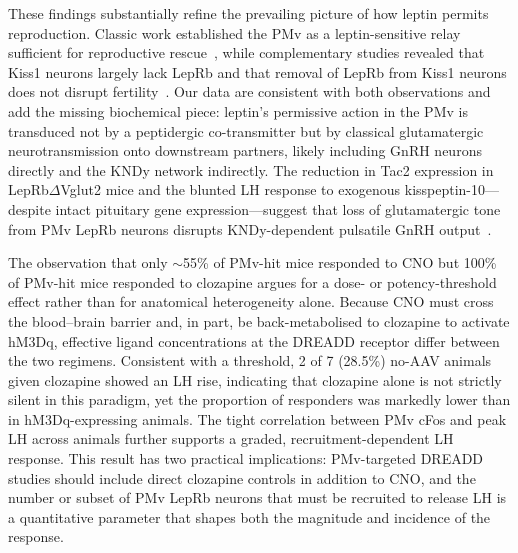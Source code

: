 \documentclass[11pt]{article}
\begin{document}
These findings substantially refine the prevailing picture of how leptin permits reproduction. Classic work established the PMv as a leptin-sensitive relay sufficient for reproductive rescue~\citep{donato2011leptin,mahany2018obesity,leshan2009direct,williams2011acute}, while complementary studies revealed that Kiss1 neurons largely lack LepRb and that removal of LepRb from Kiss1 neurons does not disrupt fertility~\citep{donato2011leptin,cravo2011kiss1,louis2011molecular,true2011leptin}. Our data are consistent with both observations and add the missing biochemical piece: leptin's permissive action in the PMv is transduced not by a peptidergic co-transmitter but by classical glutamatergic neurotransmission onto downstream partners, likely including GnRH neurons directly and the KNDy network indirectly. The reduction in Tac2 expression in LepRb$\Delta$Vglut2 mice and the blunted LH response to exogenous kisspeptin-10---despite intact pituitary gene expression---suggest that loss of glutamatergic tone from PMv LepRb neurons disrupts KNDy-dependent pulsatile GnRH output~\citep{navarro2011regulation,navarro2013interactions,gottsch2004role}.

The observation that only $\sim$55\% of PMv-hit mice responded to CNO but 100\% of PMv-hit mice responded to clozapine argues for a dose- or potency-threshold effect rather than for anatomical heterogeneity alone. Because CNO must cross the blood--brain barrier and, in part, be back-metabolised to clozapine to activate hM3Dq, effective ligand concentrations at the DREADD receptor differ between the two regimens. Consistent with a threshold, 2 of 7 (28.5\%) no-AAV animals given clozapine showed an LH rise, indicating that clozapine alone is not strictly silent in this paradigm, yet the proportion of responders was markedly lower than in hM3Dq-expressing animals. The tight correlation between PMv cFos and peak LH across animals further supports a graded, recruitment-dependent LH response. This result has two practical implications: PMv-targeted DREADD studies should include direct clozapine controls in addition to CNO, and the number or subset of PMv LepRb neurons that must be recruited to release LH is a quantitative parameter that shapes both the magnitude and incidence of the response.
\end{document}
